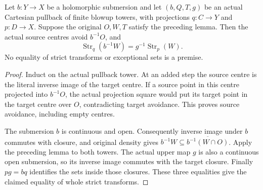 \begin{theorem}
\label{hir:original-stopped-strict-transform-smooth-square}
\leanok
{}
Let $b:Y\to X$ be a holomorphic submersion and let
$(b,Q,T,g)$ be an actual Cartesian pullback of finite blowup towers, with
projections $q:C\to Y$ and $p:D\to X$.  Suppose the original $O,W,T$
satisfy the preceding lemma.  Then the actual source centres avoid
$b^{-1}O$, and
\[
 \operatorname{Str}_q(b^{-1}W)=g^{-1}\operatorname{Str}_p(W).
\]
No equality of strict transforms or exceptional sets is a premise.
\end{theorem}
\begin{proof}
Induct on the actual pullback tower.  At an added step the source centre
is the literal inverse image of the target centre.  If a source point in
this centre projected into $b^{-1}O$, the actual projection square would
put its target point in the target centre over $O$, contradicting target
avoidance.  This proves source avoidance, including empty centres.

The submersion $b$ is continuous and open.  Consequently inverse image
under $b$ commutes with closure, and original density gives
$b^{-1}W\subseteq\overline{b^{-1}(W\cap O)}$.  Apply the preceding lemma
to both towers.  The actual upper map $g$ is also a continuous open
submersion, so its inverse image commutes with the target closure.
Finally $pg=bq$ identifies the sets inside those closures.  These three
equalities give the claimed equality of whole strict transforms.
\end{proof}

